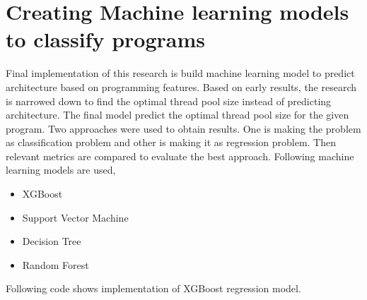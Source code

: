 \section{Creating Machine learning models to classify programs}

Final implementation of this research is build machine learning model to predict architecture based on programming features. Based on early results, the research is narrowed down to find the optimal thread pool size instead of predicting architecture. The final model predict the optimal thread pool size for the given program. Two approaches were used to obtain results. One is making the problem as classification problem and other is making it as regression problem. Then relevant metrics are compared to evaluate the best approach. Following machine learning models are used,

\begin{itemize}
	
	\item XGBoost
	\item Support Vector Machine
	\item Decision Tree
	\item Random Forest
	
\end{itemize}

Following code shows implementation of XGBoost regression model.

